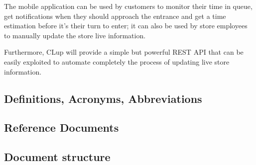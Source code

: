 The mobile application can be used by customers to monitor their time in queue, get notifications when they should approach the entrance and get a time estimation before it's their turn to enter; it can also be used by store employees to manually update the store live information.


Furthermore, CLup will provide a simple but powerful REST API that can be easily exploited to automate completely the process of updating live store information.

\pagebreak

\subsection{Definitions, Acronyms, Abbreviations}
\subsection{Reference Documents}
\subsection{Document structure}
